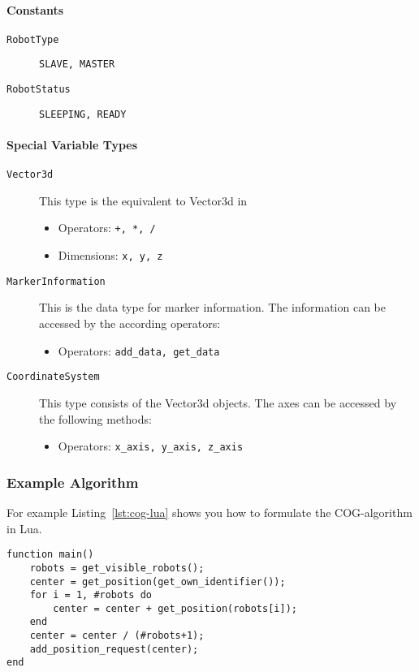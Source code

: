 \documentclass[a4paper,halfparskip,11pt,twoside]{scrartcl}
\begin{document}
\paragraph{\Lua Constants}
\begin{description}
	\item [\texttt{RobotType}] \texttt{SLAVE, MASTER}
	\item [\texttt{RobotStatus}] \texttt{SLEEPING, READY}
\end{description}

\paragraph{Special Variable Types}
\begin{description}
	\item [\texttt{Vector3d}] This type is the \Lua equivalent to Vector3d in \RSS
	\begin{itemize}
		\item Operators: \texttt{+, *, /}
		\item Dimensions: \texttt{x, y, z}
	\end{itemize}
	\item [\texttt{MarkerInformation}] This is the data type for marker information. The information can be accessed by the according operators:
	\begin{itemize}
		\item Operators: \texttt{add\_data, get\_data}
	\end{itemize}
	\item [\texttt{CoordinateSystem}] This type consists of the Vector3d objects. The axes can be accessed by the following methods:
	\begin{itemize}
		\item Operators: \texttt{x\_axis, y\_axis, z\_axis}
	\end{itemize}

\end{description}

\subsubsection{Example Algorithm}
For example Listing~\ref{lst:cog-lua} shows you how to formulate the COG-algorithm in Lua.

\lstset{language=c}
\begin{lstlisting}[caption={COG algorithm in Lua},label=lst:cog-lua]
function main() 
    robots = get_visible_robots();
    center = get_position(get_own_identifier());
    for i = 1, #robots do
        center = center + get_position(robots[i]);
    end
    center = center / (#robots+1);
    add_position_request(center);
end
\end{lstlisting}
\end{document}
